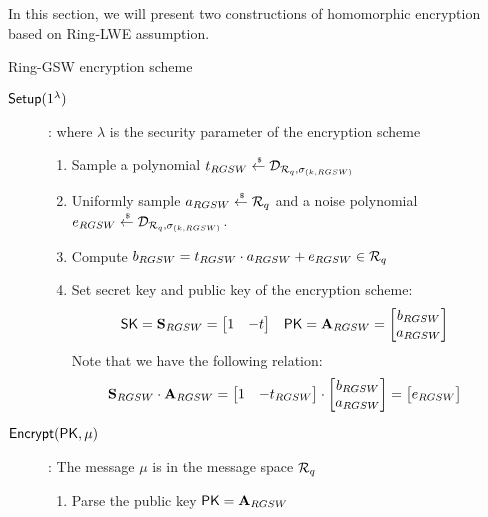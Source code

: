 In this section, we will present two constructions of homomorphic encryption based on Ring-LWE assumption.


\begin{subsection}{Ring-GSW encryption scheme~\cite{DBLP:journals/tc/KhedrGV16}}
  \begin{description}
  \item[${\mathsf{Setup}}(1^\lambda)$]: where $\lambda$ is the security parameter of the encryption scheme
    \begin{enumerate}
    \item Sample a polynomial $t_{RGSW} \stackrel{{\scriptscriptstyle \mkern4mu \$}}{\gets} \mathcal{D}_{{\mathcal{R}}_q, \sigma_{(k,RGSW)}}$
    \item Uniformly sample $a_{RGSW} \stackrel{{\scriptscriptstyle \mkern4mu \$}}{\gets} {\mathcal{R}}_q$ and a noise polynomial $e_{RGSW} \stackrel{{\scriptscriptstyle \mkern4mu \$}}{\gets} \mathcal{D}_{{\mathcal{R}}_q, \sigma_{(k, RGSW)}}$.
    \item Compute $b_{RGSW} = t_{RGSW} \cdot a_{RGSW} + e_{RGSW} \in {\mathcal{R}}_q$
    \item Set secret key and public key of the encryption scheme:
      \begin{align*}
        \mathsf{SK} &= \mathbf{S}_{RGSW} =\begin{bmatrix} 1 & -t \end{bmatrix}  & \mathsf{PK} &= \mathbf{A}_{RGSW} =  \begin{bmatrix} b_{RGSW} \\ a_{RGSW}\end{bmatrix}
      \end{align*}
      Note that we have the following relation:
      \begin{align*}
        \mathbf{S}_{RGSW} \cdot \mathbf{A}_{RGSW} &= \begin{bmatrix} 1 & -t_{RGSW} \end{bmatrix} \cdot \begin{bmatrix} b_{RGSW} \\ a_{RGSW}\end{bmatrix} = \begin{bmatrix} e_{RGSW} \end{bmatrix}
      \end{align*}
    \end{enumerate}
  \item[${\mathsf{Encrypt}}(\mathsf{PK}, \mu)$]: The message $\mu$ is in the message space ${\mathcal{R}}_q$
    \begin{enumerate}
    \item Parse the public key $\mathsf{PK} = \mathbf{A}_{RGSW}$

\end{enumerate}
\end{description}
\end{subsection}
